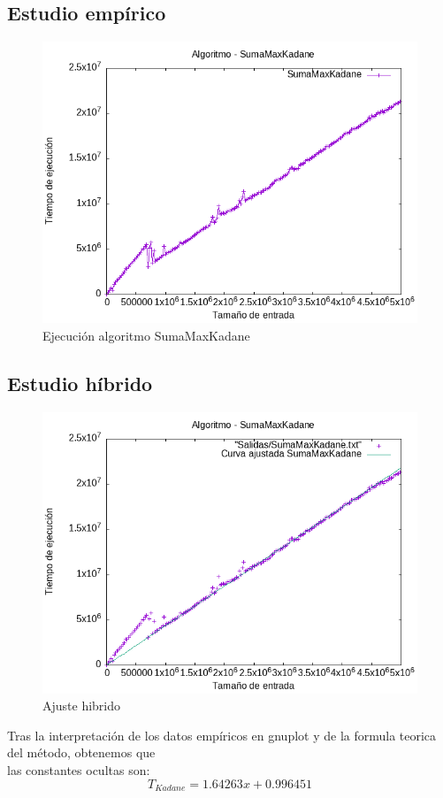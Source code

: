 \documentclass[11pt,openany]{book}
\begin{document}
\subsection{Estudio empírico}
\begin{center}
      \begin{figure}[H]
                  \centering
                  \includegraphics[width=0.7\linewidth]{assets/Img/SumaMaxKadane.png}
                  \caption{Ejecución algoritmo SumaMaxKadane}
                  \label{fig:SumaMaxKadane}
      \end{figure}
\end{center}
\subsection{Estudio híbrido}
\begin{center}
      \begin{figure}[H]
                  \centering
                  \includegraphics[width=0.7\linewidth]{assets/Img/SumaMaxKadane_hib.png}
                  \caption{Ajuste hibrido}
                  \label{fig:SumaMaxKadanehibrido}
      \end{figure}
\end{center}
Tras la interpretación de los datos empíricos en gnuplot y de la formula teorica del método, obtenemos que \\
las constantes ocultas son:
\begin{equation*}
      T_{Kadane}=1.64263x + 0.996451
\end{equation*}
\end{document}
